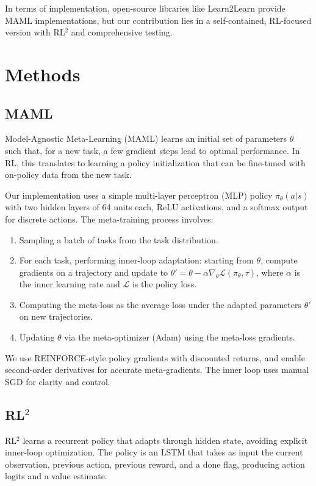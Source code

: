 \documentclass[11pt,a4paper]{article}
\begin{document}
In terms of implementation, open-source libraries like Learn2Learn \cite{arnold2020learn2learn} provide MAML implementations, but our contribution lies in a self-contained, RL-focused version with RL$^2$ and comprehensive testing.

\section{Methods}
\subsection{MAML}
Model-Agnostic Meta-Learning (MAML) learns an initial set of parameters $\theta$ such that, for a new task, a few gradient steps lead to optimal performance. In RL, this translates to learning a policy initialization that can be fine-tuned with on-policy data from the new task.

Our implementation uses a simple multi-layer perceptron (MLP) policy $\pi_\theta(a|s)$ with two hidden layers of 64 units each, ReLU activations, and a softmax output for discrete actions. The meta-training process involves:
\begin{enumerate}
  \item Sampling a batch of tasks from the task distribution.
  \item For each task, performing inner-loop adaptation: starting from $\theta$, compute gradients on a trajectory and update to $\theta' = \theta - \alpha \nabla_\theta \mathcal{L}(\pi_\theta, \tau)$, where $\alpha$ is the inner learning rate and $\mathcal{L}$ is the policy loss.
  \item Computing the meta-loss as the average loss under the adapted parameters $\theta'$ on new trajectories.
  \item Updating $\theta$ via the meta-optimizer (Adam) using the meta-loss gradients.
\end{enumerate}

We use REINFORCE-style policy gradients with discounted returns, and enable second-order derivatives for accurate meta-gradients. The inner loop uses manual SGD for clarity and control.

\subsection{RL$^2$}
RL$^2$ learns a recurrent policy that adapts through hidden state, avoiding explicit inner-loop optimization. The policy is an LSTM that takes as input the current observation, previous action, previous reward, and a done flag, producing action logits and a value estimate.
\end{document}
